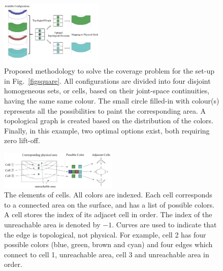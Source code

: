 \documentclass[journal]{IEEEtran}
\begin{document}
\begin{figure}[t]
\centering
\includegraphics[width = 0.44\textwidth]{flowchart}
\caption{Proposed methodology to solve the coverage problem for the set-up in Fig.~\ref{figsquare}. 
All configurations are divided into four disjoint homogeneous sets, or cells, based on their joint-space continuities, 
having the same same colour. 
The small circle filled-in with colour(s) represents all the possibilities to paint the corresponding area. A topological graph is created based on the distribution of the colors. Finally, in this example, two optimal options exist, both requiring zero lift-off.}\label{flowchart}
\end{figure}


\begin{figure}[t]
\centering
\includegraphics[width = 0.5\textwidth]{square_example/graphcreation_2}
\caption{
The elements of cells. All colors are indexed. Each cell corresponds to a connected area on the surface, and has a list of possible colors. A cell stores the index of its adjacet cell in order. %
The index of the unreachable area is denoted by $-1$. Curves are used to indicate that the edge is topological, not physical. For example, cell 2 has four possible colors (blue, green, brown and cyan) and four edges which connect to cell 1, unreachable area, cell 3 and unreachable area in order. 
}
\label{figforcolor}
\end{figure} 
\end{document}
